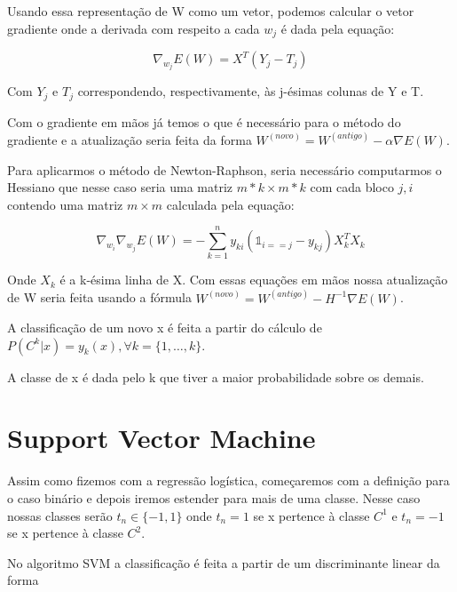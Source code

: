 Usando essa representação de W como um vetor, podemos calcular o vetor gradiente onde a derivada
com respeito a cada $w_j$ é dada pela equação:

\begin{center}
	\begin{equation}
		\nabla_{w_j} E(W) = X^T(Y_j - T_j)
	\end{equation}
\end{center}

Com $Y_j$ e $T_j$ correspondendo, respectivamente, às j-ésimas colunas de Y e T.

Com o gradiente em mãos já temos o que é necessário para o método do gradiente e a
atualização seria feita da forma $W^{ (novo) } = W^{ (antigo) } - \alpha \nabla E(W)$.

Para aplicarmos o método de Newton-Raphson, seria necessário computarmos o Hessiano que
nesse caso seria uma matriz $m*k \times m*k$ com cada bloco $j, i$ contendo uma matriz
$m \times m$ calculada pela equação:

\begin{center}
	\begin{equation}
		\nabla_{w_i} \nabla_{w_j} E(W) = - \sum_{k = 1}^n y_{ki}( \mathds{1}_{i == j} - y_{kj})
		X_k^TX_k
	\end{equation}
\end{center} 

Onde $X_k$ é a k-ésima linha de X. Com essas equações em mãos nossa atualização de
W seria feita usando a fórmula $W^{ (novo) } = W^{ (antigo) } - H^{-1}\nabla E(W)$.

A classificação de um novo x é feita a partir
do cálculo de $P(C^k | x) = y_k(x), \forall k = \{1, \ldots, k\}$.

A classe de x é dada pelo k que tiver a maior probabilidade sobre os demais.


\section{Support Vector Machine}

Assim como fizemos com a regressão logística, começaremos com a definição
para o caso binário e depois iremos estender para mais de uma classe. Nesse caso
nossas classes serão $t_n \in \{-1, 1\}$ onde $t_n = 1$ se x pertence à classe $C^1$ e
$t_n = -1$ se x pertence à classe $C^2$.

No algoritmo SVM a classificação é feita a partir de um discriminante linear
da forma 

